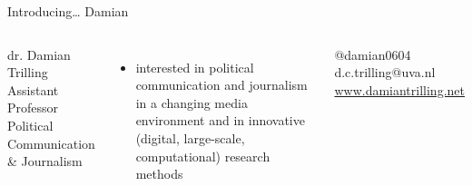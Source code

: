 \documentclass{beamer}
\begin{document}
\begin{frame}{Introducing\ldots} {\huge{Damian}} \small{} 

\begin{columns}
	dr. Damian Trilling \\
	Assistant Professor Political Communication \& Journalism \\
	\begin{itemize}
		\item interested in political communication and journalism in a changing media environment and in innovative (digital, large-scale, computational) research methods
	\end{itemize}
	@damian0604 \textbar d.c.trilling@uva.nl \textbar \url{www.damiantrilling.net} 
\end{columns}
\end{frame}
\end{document}
